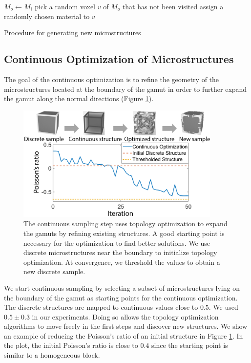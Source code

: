 
\begin{algorithm}
	\begin{algorithmic}
		\State $M_o\gets M_i$
		\State pick a random voxel $v$ of $M_o$ that has not been visited %
		\State assign a randomly chosen material to $v$
		  \EndIf
		\EndWhile
		\EndWhile
		\EndProcedure
	\end{algorithmic}
	\caption{Procedure for generating new microstructures}
	\label{algo:proc_microstructure}
\end{algorithm}

\subsection{Continuous Optimization of Microstructures}
The goal of the continuous optimization is to refine the geometry of the microstructures located at the boundary of the gamut in order to further expand the gamut along the normal directions (Figure \ref{fig:contMicro}).
\begin{figure}[h]
	\centering
	\includegraphics[width=0.9\textwidth]{images/contOpt.png}
	\vspace{-0.2cm}
	\caption{The continuous sampling step uses topology optimization to expand the gamuts by refining existing structures. A good starting point is necessary for the optimization to find better solutions. 
		We use discrete microstructures near the boundary to initialize topology optimization. 
		At convergence, we threshold the values to obtain a new discrete sample.}
	\label{fig:contMicro}
\end{figure}
We start continuous sampling by selecting a subset of microstructures lying on the boundary of the gamut as starting points for the continuous optimization. The discrete structures are mapped to continuous values close to $0.5$. We used $0.5\pm0.3$ in our experiments. Doing so allows the topology optimization algorithms to move freely in the first steps and discover new structures.
We show an example of reducing the Poisson's ratio of an initial structure in Figure \ref{fig:contMicro}. In the plot, the initial Poisson's ratio is close to $0.4$ since the starting point is similar to a homogeneous block.

